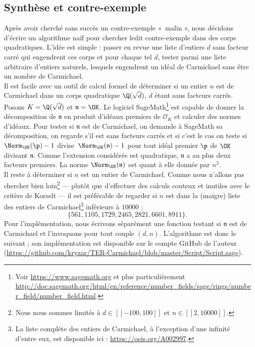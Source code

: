 \documentclass[a4paper, 12pt, oneside]{article}
\begin{document}
\subsection{Synthèse et contre-exemple}

Après avoir cherché sans succès un contre-exemple « malin », nous décidons d'écrire un algorithme naïf pour chercher ledit contre-exemple dans des corps quadratiques. L'idée est simple : passer en revue une liste d'entiers $d$ sans facteur carré qui engendrent ces corps et pour chaque tel $d$, tester parmi une liste arbitraire d'entiers naturels, lesquels engendrent un idéal de Carmichael sans être un nombre de Carmichael. \\

Il est facile avec un outil de calcul formel de déterminer si un entier $n$ est de Carmichael dans un corps quadratique $\Q(\sqrt{d})$, $d$ étant sans facteurs carrés. Posons $K=\Q(\sqrt{d})$ et $\mathfrak{n} = \OK$. Le logiciel SageMath\footnote{Voir \url{https://www.sagemath.org} et plus particulièrement \url{http://doc.sagemath.org/html/en/reference/number_fields/sage/rings/number_field/number_field.html}.} est capable de donner la décomposition de $\mathfrak{n}$ en produit d'idéaux premiers de $\mathcal{O}_K$ et calculer des normes d'idéaux. Pour tester si $\mathfrak{n}$ est de Carmichael, on demande à SageMath sa décomposition, on regarde s'il est sans facteurs carrés et si c'est le cas on teste si $\Norm_\OK(\p) - 1$ divise $\Norm_\OK(\mathfrak{n}) - 1$ pour tout idéal premier $\p$ de $\OK$ divisant $\mathfrak{n}$. Comme l'extension considérée est quadratique, $\mathfrak{n}$ a au plus deux facteurs premiers. La norme $\Norm_\OK(\mathfrak{n})$ est quant à elle donnée par $n^2$. \\

Il reste à déterminer si $n$ est un entier de Carmichael. Comme nous n'allons pas chercher bien loin\footnote{Nous nous sommes limités à $d\in [\![-100, 100]\!]$ et $n\in [\![2, 10000]\!]$.} — plutôt que d'effectuer des calculs couteux et inutiles avec le critère de Korselt — il est préférable de regarder si $n$ est dans la (maigre) liste des entiers de Carmichael\footnote{La liste complète des entiers de Carmichael, à l'exception d'une infinité d'entre eux, est disponible ici : \url{https://oeis.org/A002997}.} inférieurs à $10000$ : $$\{561, 1105, 1729, 2465, 2821, 6601, 8911\}.$$ Pour l'implémentation, nous écrivons séparément une fonction testant si $\mathfrak{n}$ est de Carmichael et l'invoquons pour tout couple $(d, n)$. L'algorithme est donc le suivant ; son implémentation est disponible sur le compte GitHub de l'auteur (\url{https://github.com/kryzar/TER-Carmichael/blob/master/Script/Script.sage}).
\end{document}
